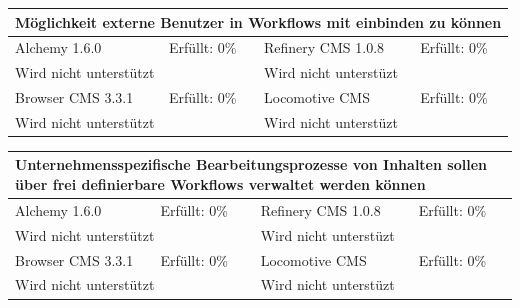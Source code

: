 \newline
\newline
\newline
\begin{tabular}[!ht]{|l|l|l|l|}
\hline
\multicolumn{4}{|p{15cm}|}{\textbf{Möglichkeit externe Benutzer in Workflows mit einbinden zu können}} \\
\hline
  Alchemy 1.6.0 & \cellcolor{red}Erfüllt: 0\% & Refinery CMS 1.0.8 & \cellcolor{red}Erfüllt: 0\% \\
  \hline
  \multicolumn{2}{|p{7.5cm}|}{Wird nicht unterstützt} & \multicolumn{2}{p{7.5cm}|}{Wird nicht unterstüzt} \\
  \hline
  Browser CMS 3.3.1 & \cellcolor{red}Erfüllt: 0\% & Locomotive CMS & \cellcolor{red}Erfüllt: 0\% \\
  \hline
  \multicolumn{2}{|p{7.5cm}|}{Wird nicht unterstützt} & \multicolumn{2}{p{7.5cm}|}{Wird nicht unterstüzt} \\
\hline
\end{tabular}
\newline
\newline
\newline
\begin{tabular}[!ht]{|l|l|l|l|}
\hline
\multicolumn{4}{|p{15cm}|}{\textbf{Unternehmensspezifische Bearbeitungsprozesse von Inhalten sollen über frei definierbare Workflows verwaltet werden können}} \\
\hline
  Alchemy 1.6.0 & \cellcolor{red}Erfüllt: 0\% & Refinery CMS 1.0.8 & \cellcolor{red}Erfüllt: 0\% \\
  \hline
  \multicolumn{2}{|p{7.5cm}|}{Wird nicht unterstützt} & \multicolumn{2}{p{7.5cm}|}{Wird nicht unterstüzt} \\
  \hline
  Browser CMS 3.3.1 & \cellcolor{red}Erfüllt: 0\% & Locomotive CMS & \cellcolor{red}Erfüllt: 0\% \\
  \hline
  \multicolumn{2}{|p{7.5cm}|}{Wird nicht unterstützt} & \multicolumn{2}{p{7.5cm}|}{Wird nicht unterstüzt} \\
\hline
\end{tabular}

